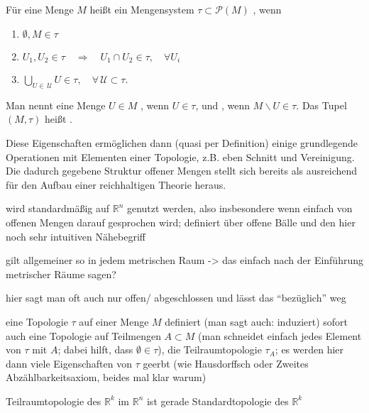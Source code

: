 \documentclass[../H_Analysis_main.tex]{subfiles}
\begin{document}
\begin{defi}[Topologie]
Für eine Menge $M$ heißt ein Mengensystem $\tau \subset \mathcal{P}(M)$ , wenn
\begin{enumerate}
\item $\emptyset, M \in \tau$

\item $U_1, U_2 \in \tau \quad \Rightarrow \quad U_1 \cap U_2 \in \tau, \quad \forall U_i$

\item $\displaystyle \bigcup_{U \in \, \mathcal{U}} U \in \tau, \quad \forall \, \mathcal{U} \subset \tau$.
\end{enumerate}

Man nennt eine Menge $U \in M$ , wenn $U \in \tau$, und , wenn $M \backslash U \in \tau$. Das Tupel $(M, \tau)$ heißt .
\end{defi}

Diese Eigenschaften ermöglichen dann (quasi per Definition) einige grundlegende Operationen mit Elementen einer Topologie, z.B. eben Schnitt und Vereinigung. Die dadurch gegebene Struktur offener Mengen stellt sich bereits als ausreichend für den Aufbau einer reichhaltigen Theorie heraus.


\begin{bsp}
wird standardmäßig auf $\mathbb{R}^n$ genutzt werden, also insbesondere wenn einfach von offenen Mengen darauf gesprochen wird; definiert über offene Bälle und den hier noch sehr intuitiven Nähebegriff

gilt allgemeiner so in jedem metrischen Raum -> das einfach nach der Einführung metrischer Räume sagen?

hier sagt man oft auch nur offen/ abgeschlossen und lässt das \enquote{bezüglich} weg
\end{bsp}

\begin{bsp}[Teilraumtopologie]
eine Topologie $\tau$ auf einer Menge $M$ definiert (man sagt auch: induziert) sofort auch eine Topologie auf Teilmengen $A \subset M$ (man schneidet einfach jedes Element von $\tau$ mit $A$; dabei hilft, dass $\emptyset \in \tau$), die Teilraumtopologie $\tau_A$; es werden hier dann viele Eigenschaften von $\tau$ geerbt (wie Hausdorffsch oder Zweites Abzählbarkeitsaxiom, beides mal klar warum)

Teilraumtopologie des $\mathbb{R}^k$ im $\mathbb{R}^n$ ist gerade Standardtopologie des $\mathbb{R}^k$
\end{bsp}
\end{document}

